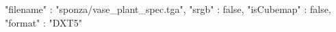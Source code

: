 { 
	"filename" : "sponza/vase_plant_spec.tga", 
	"srgb" : false,
	"isCubemap" : false,
	"format" : "DXT5"
}